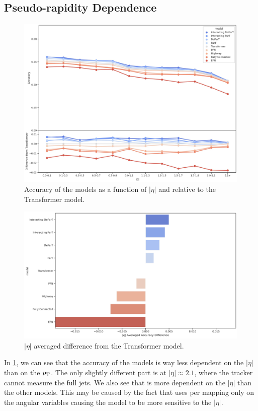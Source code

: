 \FloatBarrier

\subsection{Pseudo-rapidity Dependence}
\label{sec:eta_dependance}
\begin{figure}[htb]
    \centering
    \includegraphics[width=1\linewidth]{src/plots/results/eta_dep/relative_accuracy.jpg}
    \caption{Accuracy of the models as a function of $|\eta|$ and relative to the Transformer model.}
    \label{fig:eta_dep_acc}
\end{figure}
\begin{figure}[htb]
    \centering
    \includegraphics[width=1\linewidth]{src/plots/results/eta_dep/relative_error.jpg}
    \caption{$|\eta|$ averaged difference from the Transformer model.}
    \label{fig:eta_dep_diff}
\end{figure}
In \cref{fig:eta_dep_acc}, we can see that the accuracy of the models is way less dependent on the $|\eta|$ than on the $p_\text{T}$.
The only slightly different part is at $|\eta| \approx 2.1$, where the tracker cannot measure the full jets.
We also see that \EFN is more dependent on the $|\eta|$ than the other models.
This may be caused by the fact that \EFN uses per \PFO mapping only on the angular variables causing the model to be more sensitive to the $|\eta|$.

